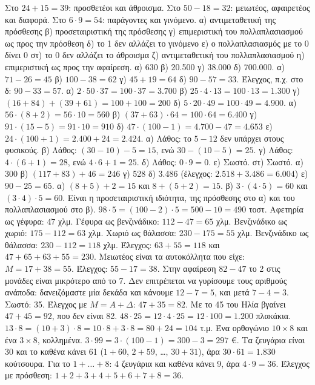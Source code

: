  Στο $24+15=39$: προσθετέοι και άθροισμα. Στο $50-18=32$: μειωτέος, αφαιρετέος και διαφορά. Στο $6\cdot 9=54$: παράγοντες και γινόμενο.
 α) αντιμεταθετική της πρόσθεσης \quad β) προσεταιριστική της πρόσθεσης \quad γ) επιμεριστική του πολλαπλασιασμού ως προς την πρόσθεση \quad δ) το 1 δεν αλλάζει το γινόμενο \quad ε) ο πολλαπλασιασμός με το 0 δίνει 0 \quad στ) το 0 δεν αλλάζει το άθροισμα \quad ζ) αντιμεταθετική του πολλαπλασιασμού \quad η) επιμεριστική ως προς την αφαίρεση.
 α) 630 \quad β) 20.500 \quad γ) 38.000 \quad δ) 700.000.
 α) $71-26=45$ \quad β) $100-38=62$ \quad γ) $45+19=64$ \quad δ) $90-57=33$. Έλεγχος, π.χ. στο δ: $90-33=57$.
 α) $2\cdot 50\cdot 37=100\cdot 37=3.700$ \quad β) $25\cdot 4\cdot 13=100\cdot 13=1.300$ \quad γ) $(16+84)+(39+61)=100+100=200$ \quad δ) $5\cdot 20\cdot 49=100\cdot 49=4.900$.
 α) $56\cdot(8+2)=56\cdot 10=560$ \quad β) $(37+63)\cdot 64=100\cdot 64=6.400$ \quad γ) $91\cdot(15-5)=91\cdot 10=910$ \quad δ) $47\cdot(100-1)=4.700-47=4.653$ \quad ε) $24\cdot(100+1)=2.400+24=2.424$.
 α) Λάθος: το $5-12$ δεν υπάρχει στους φυσικούς. β) Λάθος: $(30-10)-5=15$, ενώ $30-(10-5)=25$. γ) Λάθος: $4\cdot(6+1)=28$, ενώ $4\cdot 6+1=25$. δ) Λάθος: $0\cdot 9=0$. ε) Σωστό. στ) Σωστό.
 α) 300 \quad β) $(117+83)+46=246$ \quad γ) 528 \quad δ) 3.486 (έλεγχος: $2.518+3.486=6.004$) \quad ε) $90-25=65$.
 α) $(8+5)+2=15$ και $8+(5+2)=15$. β) $3\cdot(4\cdot 5)=60$ και $(3\cdot 4)\cdot 5=60$. Είναι η προσεταιριστική ιδιότητα, της πρόσθεσης στο α) και του πολλαπλασιασμού στο β).
 $98\cdot 5=(100-2)\cdot 5=500-10=490$ τοστ.
 Αφετηρία ως γέφυρα: $47$ χλμ. Γέφυρα ως βενζινάδικο: $112-47=65$ χλμ. Βενζινάδικο ως χωριό: $175-112=63$ χλμ. Χωριό ως θάλασσα: $230-175=55$ χλμ. Βενζινάδικο ως θάλασσα: $230-112=118$ χλμ. Έλεγχος: $63+55=118$ και $47+65+63+55=230$.
 Μειωτέος είναι τα αυτοκόλλητα που είχε: $Μ=17+38=55$. Έλεγχος: $55-17=38$.
 Στην αφαίρεση $82-47$ το 2 στις μονάδες είναι μικρότερο από το 7. Δεν επιτρέπεται να γυρίσουμε τους αριθμούς ανάποδα: δανειζόμαστε μία δεκάδα και κάνουμε $12-7=5$, και μετά $7-4=3$. Σωστό: 35. Έλεγχος με $Μ=Α+\Delta$: $47+35=82$. Με το 45 του Ηλία βγαίνει $47+45=92$, που δεν είναι 82.
 $48\cdot 25=12\cdot 4\cdot 25=12\cdot 100=1.200$ πλακάκια.
 $13\cdot 8=(10+3)\cdot 8=10\cdot 8+3\cdot 8=80+24=104$ τ.μ. Ένα ορθογώνιο $10\times 8$ και ένα $3\times 8$, κολλημένα.
 $3\cdot 99=3\cdot(100-1)=300-3=297$ €.
 Τα ζευγάρια είναι 30 και το καθένα κάνει 61 ($1+60$, $2+59$, \dots, $30+31$), άρα $30\cdot 61=1.830$ κούτσουρα. Για το $1+\dots+8$: 4 ζευγάρια και καθένα κάνει 9, άρα $4\cdot 9=36$. Έλεγχος με πρόσθεση: $1+2+3+4+5+6+7+8=36$.
